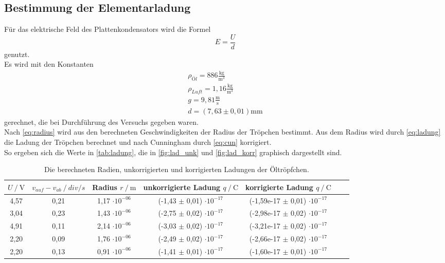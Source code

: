 \subsection*{Bestimmung der Elementarladung}

Für das elektrische Feld des Plattenkondensators wird die Formel
\begin{equation}
  E = \frac{U}{d}
\end{equation}
genutzt.\\
Es wird mit den Konstanten 
\begin{eqnarray}
  \rho_{Öl} = 886 \mathrm{\frac{kg}{m^3}}\\
  \rho_{Luft} = 1,16 \mathrm{\frac{kg}{m^3}}\\
  g = 9,81 \mathrm{\frac{m}{s}} \\
  d = (7,63 \pm 0,01) \mathrm{mm}
\end{eqnarray}
gerechnet, die bei Durchführung des Versuchs gegeben waren. \\

Nach \autoref{eq:radius} wird aus den berechneten Geschwindigkeiten der Radius
der Tröpchen bestimmt. Aus dem Radius wird durch \autoref{eq:ladung} die Ladung der Tröpchen berechnet und nach Cunningham durch \autoref{eq:cun} korrigiert. \\
So ergeben sich die Werte in \autoref{tab:ladung}, die in \autoref{fig:lad_unk} und \autoref{fig:lad_korr} graphisch dargestellt sind.\\

\begin{table}[H]
  \centering
  \caption{Die berechneten Radien, unkorrigierten und korrigierten Ladungen der Öltröpfchen.}
  \begin{tabular}{ccccccc}
    \toprule
    {$U  \mathbin{/} \unit{\volt}$} &
    {$v_{auf} - v_{ab} \mathbin{/} \mathbin{div / s}$} &
    {Radius $r \mathbin{/} \unit{\metre} $} & %
    {unkorrigierte Ladung $q \mathbin{/} \unit{\coulomb}$} &
    {korrigierte Ladung $q \mathbin{/} \unit{\coulomb}$} \\
    \midrule
    4,57  & 0,21  &  1,17 $\cdot 10^{-06}$  &  (-1,43 $\pm$ 0,01) $\cdot 10^{-17}$  & (-1,59e-17 $\pm$ 0,01) $\cdot 10^{-17}$  \\
    3,04  & 0,23  &  1,43 $\cdot 10^{-06}$  &  (-2,75 $\pm$ 0,02) $\cdot 10^{-17}$ & (-2,98e-17 $\pm$ 0,02) $\cdot 10^{-17}$  \\
    4,91  & 0,11  &  2,14 $\cdot 10^{-06}$  &  (-3,03  $\pm$ 0,02) $\cdot 10^{-17}$   & (-3,21e-17  $\pm$ 0,02) $\cdot 10^{-17}$  \\
    2,20  & 0,09  &  1,76 $\cdot 10^{-06}$  &  (-2,49 $\pm$ 0,02) $\cdot 10^{-17}$  & (-2,66e-17  $\pm$ 0,02) $\cdot 10^{-17}$  \\
    2,20  & 0,13  &  0,91 $\cdot 10^{-06}$  &  (-1,41  $\pm$ 0,01) $\cdot 10^{-17}$    & (-1,60e-17  $\pm$ 0,01) $\cdot 10^{-17}$  \\
    \bottomrule
  \end{tabular}
  \label{tab:ladung}
\end{table}

